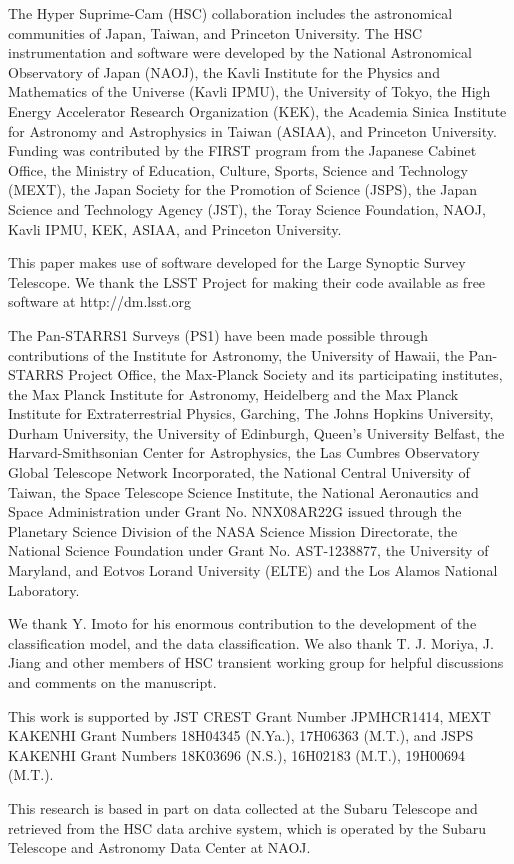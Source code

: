\documentclass[proof]{pasj01}
\begin{document}
\begin{ack}
The Hyper Suprime-Cam (HSC) collaboration includes the astronomical communities of Japan, Taiwan, and Princeton University. The HSC instrumentation and software were developed by the National Astronomical Observatory of Japan (NAOJ), the Kavli Institute for the Physics and Mathematics of the Universe (Kavli IPMU), the University of Tokyo, the High Energy Accelerator Research Organization (KEK), the Academia Sinica Institute for Astronomy and Astrophysics in Taiwan (ASIAA), and Princeton University. Funding was contributed by the FIRST program from the Japanese Cabinet Office, the Ministry of Education, Culture, Sports, Science and Technology (MEXT), the Japan Society for the Promotion of Science (JSPS), the Japan Science and Technology Agency (JST), the Toray Science Foundation, NAOJ, Kavli IPMU, KEK, ASIAA, and Princeton University.

This paper makes use of software developed for the Large Synoptic Survey Telescope. We thank the LSST Project for making their code available as free software at  http://dm.lsst.org

The Pan-STARRS1 Surveys (PS1) have been made possible through contributions of the Institute for Astronomy, the University of Hawaii, the Pan-STARRS Project Office, the Max-Planck Society and its participating institutes, the Max Planck Institute for Astronomy, Heidelberg and the Max Planck Institute for Extraterrestrial Physics, Garching, The Johns Hopkins University, Durham University, the University of Edinburgh, Queen’s University Belfast, the Harvard-Smithsonian Center for Astrophysics, the Las Cumbres Observatory Global Telescope Network Incorporated, the National Central University of Taiwan, the Space Telescope Science Institute, the National Aeronautics and Space Administration under Grant No. NNX08AR22G issued through the Planetary Science Division of the NASA Science Mission Directorate, the National Science Foundation under Grant No. AST-1238877, the University of Maryland, and Eotvos Lorand University (ELTE) and the Los Alamos National Laboratory.

We thank Y. Imoto for his enormous contribution to the development of the classification model, and the data classification.
We also thank T. J. Moriya, J. Jiang and other members of HSC transient working group for helpful discussions and comments on the manuscript.

This work is supported by JST CREST Grant Number JPMHCR1414, MEXT KAKENHI Grant Numbers 18H04345 (N.Ya.), 17H06363 (M.T.), and JSPS KAKENHI Grant Numbers 18K03696 (N.S.), 16H02183 (M.T.), 19H00694 (M.T.).

This research is based in part on data collected at the Subaru Telescope and retrieved from the HSC data archive system, which is operated by the Subaru Telescope and Astronomy Data Center at NAOJ.
\end{ack}
%
%
\appendix 
\end{document}
